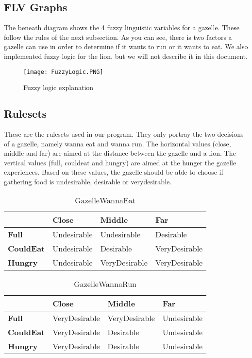 \subsection{FLV Graphs}\label{subsec:flvGraphs}
The beneath diagram shows the 4 fuzzy linguistic variables for a gazelle.
These follow the rules of the next subsection.
As you can see, there is two factors a gazelle can use in order to determine if it wants to run or it wants to eat.
We also implemented fuzzy logic for the lion, but we will not describe it in this document.
\begin{figure}[ht]
    \begin{center}
        \texttt{[image: FuzzyLogic.PNG]}
    \end{center}
    \caption{Fuzzy logic explanation}
    \label{fig:FuzzyLogicExplanation}
\end{figure}
\subsection{Rulesets}
These are the rulesets used in our program.
They only portray the two decisions of a gazelle, namely wanna eat and wanna run.
The horizontal values (close, middle and far) are aimed at the distance between the gazelle and a lion.
The vertical values (full, couldeat and hungry) are aimed at the hunger the gazelle experiences.
Based on these values, the gazelle should be able to choose if gathering food is undesirable, desirable or verydesirable.
\begin{table}[ht]
    \centering
    \label{EatDesirability}
    \begin{tabular}{|l|l|l|l|}
        \hline
        & \textbf{Close}       & \textbf{Middle}        & \textbf{Far}           \\ \hline
        \textbf{Full}     & Undesirable & Undesirable   & Desirable     \\ \hline
        \textbf{CouldEat} & Undesirable & Desirable     & VeryDesirable \\ \hline
        \textbf{Hungry}   & Undesirable & VeryDesirable & VeryDesirable \\ \hline
    \end{tabular}
    \caption{GazelleWannaEat}
\end{table}
\begin{table}[ht]
    \centering
    \label{|RunDesirability}
    \begin{tabular}{|l|l|l|l|}
        \hline
        & \textbf{Close}       & \textbf{Middle}        & \textbf{Far}           \\ \hline
        \textbf{Full}     & VeryDesirable & VeryDesirable   & Undesirable     \\ \hline
        \textbf{CouldEat} & VeryDesirable & Desirable     & Undesirable \\ \hline
        \textbf{Hungry}   & VeryDesirable & Desirable & Undesirable \\ \hline
    \end{tabular}
    \caption{GazelleWannaRun}
\end{table}
